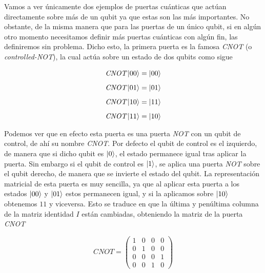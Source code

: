 \documentclass[12pt]{article}
\numberwithin{equation}{section} %
\begin{document}
    Vamos a ver únicamente dos ejemplos de puertas cuánticas que actúan directamente sobre más de un qubit ya que estas son las más importantes. No obstante, de la misma manera que para las puertas de un único qubit, si en algún otro momento necesitamos definir más puertas cuánticas con algún fin, las definiremos sin problema. Dicho esto, la primera puerta es la famosa \textit{CNOT} (o \textit{controlled-NOT}), la cual actúa sobre un estado de dos qubits como sigue

    \begin{align*}
        \textit{CNOT} \ket{0 0} &= \ket{0 0} \\[5pt]
        \textit{CNOT} \ket{0 1} &= \ket{0 1} \\[5pt]
        \textit{CNOT} \ket{1 0} &= \ket{1 1} \\[5pt]
        \textit{CNOT} \ket{1 1} &= \ket{1 0}
    \end{align*}

    \vspace{2.5mm}

    Podemos ver que en efecto esta puerta es una puerta \textit{NOT} con un qubit de control, de ahí su nombre \textit{CNOT}. Por defecto el qubit de control es el izquierdo, de manera que si dicho qubit es \( \ket{0} \), el estado permanece igual tras aplicar la puerta. Sin embargo si el qubit de control es \( \ket{1} \), se aplica una puerta \textit{NOT} sobre el qubit derecho, de manera que se invierte el estado del qubit. La representación matricial de esta puerta es muy sencilla, ya que al aplicar esta puerta a los estados \( \ket{0 0} \) y \( \ket{0 1} \) estos permanecen igual, y si la aplicamos sobre \( \ket{1 0} \) obtenemos \(1 1\) y viceversa. Esto se traduce en que la última y penúltima columna de la matriz identidad \( I \) están cambiadas, obteniendo la matriz de la puerta \textit{CNOT}
    
    \begin{equation}
        \textit{CNOT} = \begin{pmatrix}
            1 & 0 & 0 & 0 \\
            0 & 1 & 0 & 0 \\
            0 & 0 & 0 & 1 \\
            0 & 0 & 1 & 0
        \end{pmatrix}
        \label{eq: cnot_matriz}
    \end{equation}

    \vspace{2.5mm}
\end{document}
